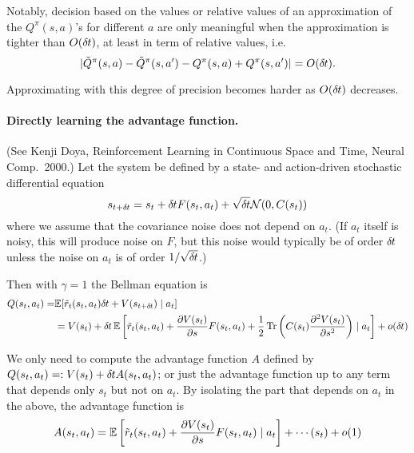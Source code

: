 Notably, decision based on the values or relative values of an approximation of
the $Q^\pi(s, a)$'s for different $a$ are only meaningful when the
approximation is tighter than $O (\delta\hspace{-.06em}t)$, at least in term of relative
values, i.e.  
\begin{equation*}
	|\tilde{Q}^\pi(s, a) - \tilde{Q}^\pi(s, a') - Q^\pi(s, a) +
	Q^\pi(s, a')| = O (\delta\hspace{-.06em}t).
\end{equation*}

Approximating with this degree of precision becomes harder as $O (\delta\hspace{-.06em}t)$
decreases. 

\paragraph{Directly learning the advantage function.}
(See Kenji Doya, Reinforcement Learning in Continuous Space and Time,
Neural Comp.\ 2000.)
Let the system be defined by a state- and action-driven stochastic
differential equation
\begin{equation}
s_{t+\delta\hspace{-.06em}t}=s_t+\delta\hspace{-.06em}t F(s_t,a_t)+\sqrt{\delta\hspace{-.06em}t}\mathcal{N}(0,C(s_t))
\end{equation}
where we assume that the covariance noise does not depend on $a_t$. (If
$a_t$ itself is noisy, this will produce noise on $F$, but this noise
would typically be of order $\delta\hspace{-.06em}t$ unless the noise on $a_t$ is of
order $1/\sqrt{\delta\hspace{-.06em}t}$.)

Then with $\gamma=1$ the Bellman equation is
\begin{align}
Q(s_t,a_t)=&\mathbb{E}[ \tilde{r}_t(s_t,a_t) \delta\hspace{-.06em}t + V(s_{t+\delta\hspace{-.06em}t}) \mid a_t]
\\&=V(s_t)+\delta\hspace{-.06em}t \,\mathbb{E}\left[\tilde{r}_t(s_t,a_t)+\frac{\partial V(s_t)}{\partial
s}F(s_t,a_t)+\frac12 \operatorname{Tr} \left(C(s_t)\frac{\partial^2 V(s_t)}{\partial
s^2}\right)\mid a_t\right]+o(\delta\hspace{-.06em}t)
\end{align}

We only need to compute the advantage function $A$ defined by
$Q(s_t,a_t)=\mathrel{\mathop{:}} V(s_t)+\delta\hspace{-.06em}t A(s_t,a_t)$; or just the advantage function
up to any term that depends only $s_t$ but not on $a_t$. By isolating the
part that
depends on $a_t$ in the above, the advantage function is
\begin{equation}
A(s_t,a_t)=\mathbb{E}\left[\tilde{r}_t(s_t,a_t)+\frac{\partial
V(s_t)}{\partial
s}F(s_t,a_t)\mid a_t\right]+\cdots(s_t)+o(1)
\end{equation}

